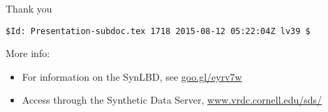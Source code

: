 \setcounter{finalframe}{\value{framenumber}}
\setcounter{framenumber}{\value{finalframe}}


\begin{frame}
Thank you
\end{frame}


\begin{frame}[fragile]

\tiny\vspace{0.8\textheight}\vfill 
\begin{verbatim}
$Id: Presentation-subdoc.tex 1718 2015-08-12 05:22:04Z lv39 $
\end{verbatim}
\end{frame}



\begin{frame}
\begin{center}
More info: 
\begin{itemize}
\item For information on the SynLBD, see 
\href{http://www2.vrdc.cornell.edu/news/data/lbd-synthetic-data/}{goo.gl/eyrv7w}
\item Access through the Synthetic Data Server, 
\href{http://www.vrdc.cornell.edu/sds/}{www.vrdc.cornell.edu/sds/} 
\end{itemize}

\end{center}
\end{frame}

